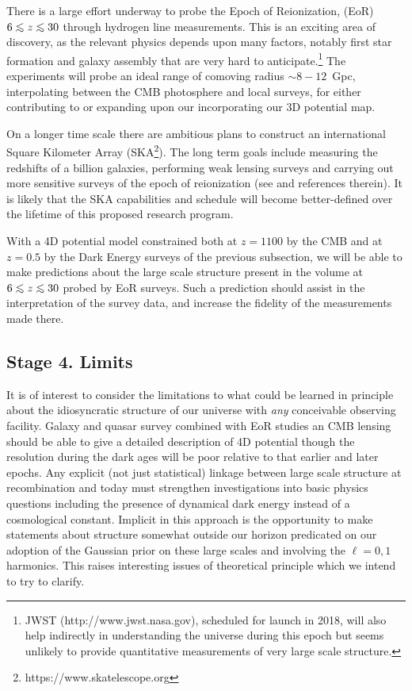 \documentclass[psfig,11pt]{article}
\def\ni{\noindent}
\def\lo{\mathrel{\raise.3ex\hbox{$<$}\mkern-14mu\lower0.6ex\hbox{$\sim$}}}
\begin{document}
{\ni{\bf Epoch of Reionization:}
There is a large effort underway to probe the Epoch of Reionization, (EoR) $6\lo z\lo30$ through hydrogen line measurements. This is an exciting area of discovery, as the relevant physics depends upon many factors, notably first star formation and galaxy assembly that are very hard to anticipate.\footnote{JWST (http://www.jwst.nasa.gov), scheduled for launch in 2018, will also help indirectly in understanding the universe during this epoch but seems unlikely to provide quantitative measurements of very large scale structure.} The experiments will probe an ideal range of comoving radius $\sim8-12$~Gpc, interpolating between the CMB photosphere and local surveys,  for either contributing to or expanding upon our incorporating our 3D potential map.

On a longer time scale there are ambitious plans to construct an international Square Kilometer Array (SKA\footnote{https://www.skatelescope.org}). The long term goals include measuring the redshifts of a billion galaxies, performing weak lensing surveys and carrying out more sensitive surveys of the epoch of reionization (see  \cite{SKACosmology} and references therein). It is likely that the SKA capabilities and schedule will become better-defined over the lifetime of this proposed research program.

With a 4D potential model constrained both at $z=1100$ by the CMB and at $z=0.5$ by the Dark Energy surveys of the previous subsection, we will be able to make predictions about the large scale structure present in the volume at $6\lo z\lo30$ probed by EoR surveys. Such a prediction should assist in the interpretation of the survey data, and increase the fidelity of the measurements made there.

\subsection{Stage 4. Limits}
It is of interest to consider the limitations to what could be learned in principle about the idiosyncratic structure of our universe with {\it any} conceivable observing facility. Galaxy and quasar survey combined with EoR studies an CMB lensing should be able to give a detailed description of 4D potential though the resolution during the dark ages will be poor relative to that earlier and later epochs. Any explicit (not just statistical) linkage between large scale structure at recombination and today must strengthen investigations into basic physics questions including the presence of dynamical dark energy instead of a cosmological constant. Implicit in this approach is the opportunity to make statements about structure somewhat outside our horizon predicated on our adoption of the Gaussian prior on these large scales and involving the $\ell=0,1$ harmonics. This raises interesting issues of theoretical principle which we intend to try to clarify.


}
\end{document}
